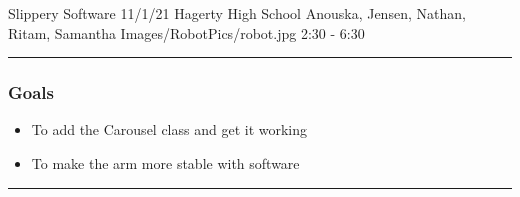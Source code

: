 \insertmeeting 
	{Slippery Software} 
	{11/1/21}
	{Hagerty High School}
	{Anouska, Jensen, Nathan, Ritam, Samantha}
	{Images/RobotPics/robot.jpg}
	{2:30 - 6:30}
	
\noindent\hfil\rule{\textwidth}{.4pt}\hfil
\subsubsection*{Goals}
\begin{itemize}
    \item To add the Carousel class and get it working
    \item To make the arm more stable with software

\end{itemize} 

\noindent\hfil\rule{\textwidth}{.4pt}\hfil

